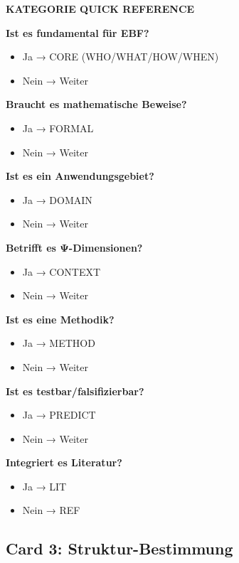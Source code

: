 \documentclass[12pt,a4paper]{article}
\begin{document}
\begin{tcolorbox}[colback=gray!10!white, colframe=black]
\textbf{KATEGORIE QUICK REFERENCE}

\textbf{Ist es fundamental für EBF?}
\begin{itemize}[nosep]
\item Ja → CORE (WHO/WHAT/HOW/WHEN)
\item Nein → Weiter
\end{itemize}

\textbf{Braucht es mathematische Beweise?}
\begin{itemize}[nosep]
\item Ja → FORMAL
\item Nein → Weiter
\end{itemize}

\textbf{Ist es ein Anwendungsgebiet?}
\begin{itemize}[nosep]
\item Ja → DOMAIN
\item Nein → Weiter
\end{itemize}

\textbf{Betrifft es Ψ-Dimensionen?}
\begin{itemize}[nosep]
\item Ja → CONTEXT
\item Nein → Weiter
\end{itemize}

\textbf{Ist es eine Methodik?}
\begin{itemize}[nosep]
\item Ja → METHOD
\item Nein → Weiter
\end{itemize}

\textbf{Ist es testbar/falsifizierbar?}
\begin{itemize}[nosep]
\item Ja → PREDICT
\item Nein → Weiter
\end{itemize}

\textbf{Integriert es Literatur?}
\begin{itemize}[nosep]
\item Ja → LIT
\item Nein → REF
\end{itemize}
\end{tcolorbox}

\subsection{Card 3: Struktur-Bestimmung}
\end{document}
